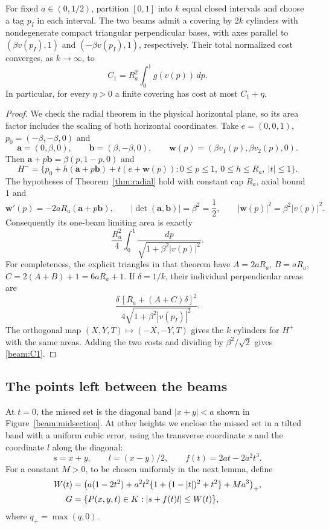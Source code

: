 \begin{lemma}\label{beam:finite-beams}
For fixed $a\in(0,1/2)$, partition $[0,1]$ into $k$ equal closed
intervals and choose a tag $p_I$ in each interval. The two beams admit
a covering by $2k$ cylinders with nondegenerate compact triangular
perpendicular bases, with axes parallel to $(\beta v(p_I),1)$ and
$(-\beta v(p_I),1)$, respectively. Their total normalized cost converges,
as $k\to\infty$, to
\begin{equation}\label{beam:C1}
 C_1=R_a^2\int_0^1 g(v(p))\,dp.
\end{equation}
In particular, for every $\eta>0$ a finite covering has cost at most
$C_1+\eta$.
\end{lemma}
\begin{proof}
We check the radial theorem in the physical horizontal plane, so its
area factor includes the scaling of both horizontal coordinates.
Take $e=(0,0,1)$, $p_0=(-\beta,-\beta,0)$ and
\[
 \mathbf a=(0,\beta,0),\qquad
 \mathbf b=(\beta,-\beta,0),\qquad
 \mathbf w(p)=(\beta v_1(p),\beta v_2(p),0).
\]
Then $\mathbf a+p\mathbf b=\beta(p,1-p,0)$ and
\[
 H^-=\{p_0+h(\mathbf a+p\mathbf b)+t(e+\mathbf w(p)):
       0\le p\le1,\ 0\le h\le R_a,\ |t|\le1\}.
\]
The hypotheses of Theorem~\ref{thm:radial} hold with constant cap $R_a$,
axial bound $1$ and
\[
 \mathbf w'(p)=-2aR_a(\mathbf a+p\mathbf b),\qquad
 |\det(\mathbf a,\mathbf b)|=\beta^2=\frac12,
 \qquad |\mathbf w(p)|^2=\beta^2|v(p)|^2.
\]
Consequently its one-beam limiting area is exactly
\begin{equation}\label{beam:physical-radial-cost}
 \frac{R_a^2}{4}\int_0^1\frac{dp}{\sqrt{1+\beta^2|v(p)|^2}}.
\end{equation}
For completeness, the explicit triangles in that theorem have
$A=2aR_a$, $B=aR_a$, $C=2(A+B)+1=6aR_a+1$. If $\delta=1/k$, their
individual perpendicular areas are
\[
 \frac{\delta\,[R_a+(A+C)\delta]^2}
      {4\sqrt{1+\beta^2|v(p_I)|^2}}.
\]
The orthogonal map $(X,Y,T)\mapsto(-X,-Y,T)$ gives the $k$ cylinders
for $H^+$ with the same areas. Adding the two costs and dividing by
$\beta^2/\sqrt2$ gives \eqref{beam:C1}.
\end{proof}

\subsection{The points left between the beams}

At $t=0$, the missed set is the diagonal band $|x+y|<a$ shown in
Figure~\ref{beam:midsection}. At other heights we enclose the missed
set in a tilted band with a uniform cubic error, using the transverse
coordinate $s$ and the coordinate $l$ along the diagonal:
\[
 s=x+y,\qquad l=(x-y)/2,\qquad f(t)=2at-2a^2t^3.
\]
For a constant $M>0$, to be chosen uniformly in the next lemma, define
\begin{align}
 W(t)&=\bigl(a(1-2t^2)
       +a^2t^2\{1+(1-|t|)^2+t^2\}+Ma^3\bigr)_+,
       \label{beam:width}\\
 G&=\{P(x,y,t)\in K:|s+f(t)l|\le W(t)\},\notag
\end{align}
where $q_+=\max(q,0)$.


